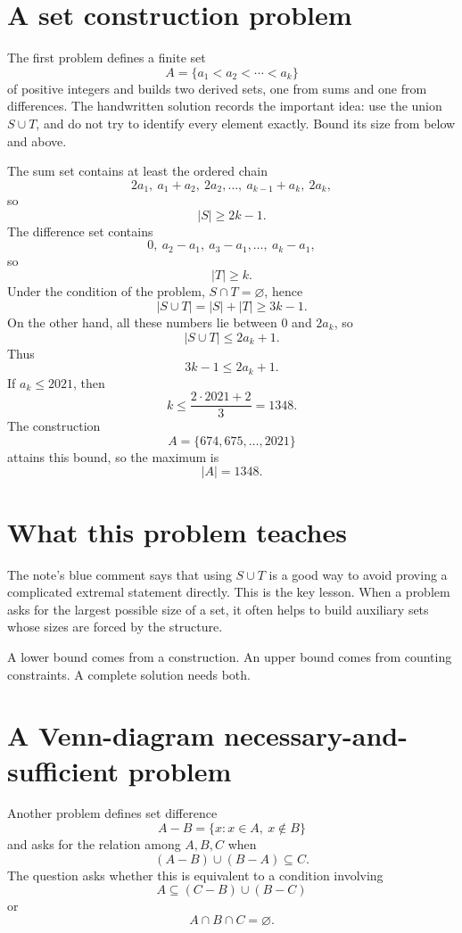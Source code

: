 
\section{A set construction problem}

The first problem defines a finite set
\[
  A=\{a_1<a_2<\cdots<a_k\}
\]
of positive integers and builds two derived sets, one from sums and one from differences.  The handwritten solution records the important idea: use the union \(S\cup T\), and do not try to identify every element exactly.  Bound its size from below and above.

The sum set contains at least the ordered chain
\[
  2a_1,\ a_1+a_2,\ 2a_2,\ldots,\ a_{k-1}+a_k,\ 2a_k,
\]
so
\[
  |S|\ge2k-1.
\]
The difference set contains
\[
  0,\ a_2-a_1,\ a_3-a_1,\ldots,\ a_k-a_1,
\]
so
\[
  |T|\ge k.
\]
Under the condition of the problem, \(S\cap T=\varnothing\), hence
\[
  |S\cup T|=|S|+|T|\ge3k-1.
\]
On the other hand, all these numbers lie between \(0\) and \(2a_k\), so
\[
  |S\cup T|\le2a_k+1.
\]
Thus
\[
  3k-1\le2a_k+1.
\]
If \(a_k\le2021\), then
\[
  k\le\frac{2\cdot2021+2}{3}=1348.
\]
The construction
\[
  A=\{674,675,\ldots,2021\}
\]
attains this bound, so the maximum is
\[
  |A|=1348.
\]

\section{What this problem teaches}

The note's blue comment says that using \(S\cup T\) is a good way to avoid proving a complicated extremal statement directly.  This is the key lesson.  When a problem asks for the largest possible size of a set, it often helps to build auxiliary sets whose sizes are forced by the structure.

A lower bound comes from a construction.  An upper bound comes from counting constraints.  A complete solution needs both.

\section{A Venn-diagram necessary-and-sufficient problem}

Another problem defines set difference
\[
  A-B=\{x:x\in A,\ x\notin B\}
\]
and asks for the relation among \(A,B,C\) when
\[
  (A-B)\cup(B-A)\subseteq C.
\]
The question asks whether this is equivalent to a condition involving
\[
  A\subseteq(C-B)\cup(B-C)
\]
or
\[
  A\cap B\cap C=\varnothing.
\]

